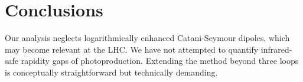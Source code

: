 \section{Conclusions}\label{sec:conclusions}

Our analysis neglects logarithmically enhanced Catani-Seymour dipoles,
which may become relevant at the LHC. We have not attempted to quantify
infrared-safe rapidity gaps of photoproduction. Extending the method
beyond three loops is conceptually straightforward but technically
demanding.

